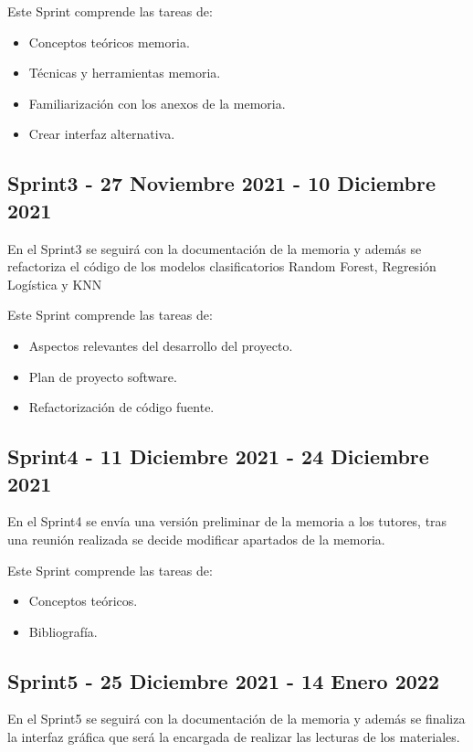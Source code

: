 Este Sprint comprende las tareas de:

\begin{itemize}
\item Conceptos teóricos memoria.
\item Técnicas y herramientas memoria.
\item Familiarización con los anexos de la memoria.
\item Crear interfaz alternativa.
\end{itemize}

\subsection{Sprint3 - 27 Noviembre 2021 - 10 Diciembre 2021}

En el Sprint3 se seguirá con la documentación de la memoria y además se refactoriza el código de los modelos clasificatorios Random Forest, Regresión Logística y KNN

Este Sprint comprende las tareas de:

\begin{itemize}
\item Aspectos relevantes del desarrollo del proyecto.
\item Plan de proyecto software.
\item Refactorización de código fuente.
\end{itemize}

\subsection{Sprint4 - 11 Diciembre 2021 - 24 Diciembre 2021}

En el Sprint4 se envía una versión preliminar de la memoria a los tutores, tras una reunión realizada se decide modificar apartados de la memoria.

Este Sprint comprende las tareas de:

\begin{itemize}
\item Conceptos teóricos.
\item Bibliografía.
\end{itemize}

\subsection{Sprint5 - 25 Diciembre 2021 - 14 Enero 2022}

En el Sprint5 se seguirá con la documentación de la memoria y además se finaliza la interfaz gráfica que será la encargada de realizar las lecturas de los materiales.

